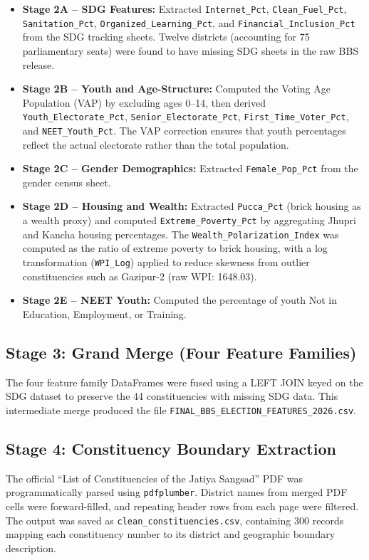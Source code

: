 \documentclass[12pt, a4paper]{article}
\begin{document}
\begin{itemize}
    \item \textbf{Stage 2A -- SDG Features:} Extracted \texttt{Internet\_Pct}, \texttt{Clean\_Fuel\_Pct}, \texttt{Sanitation\_Pct}, \texttt{Organized\_Learning\_Pct}, and \texttt{Financial\_Inclusion\_Pct} from the SDG tracking sheets. Twelve districts (accounting for 75 parliamentary seats) were found to have missing SDG sheets in the raw BBS release.
    \item \textbf{Stage 2B -- Youth and Age-Structure:} Computed the Voting Age Population (VAP) by excluding ages 0--14, then derived \texttt{Youth\_Electorate\_Pct}, \texttt{Senior\_Electorate\_Pct}, \texttt{First\_Time\_Voter\_Pct}, and \texttt{NEET\_Youth\_Pct}. The VAP correction ensures that youth percentages reflect the actual electorate rather than the total population.
    \item \textbf{Stage 2C -- Gender Demographics:} Extracted \texttt{Female\_Pop\_Pct} from the gender census sheet.
    \item \textbf{Stage 2D -- Housing and Wealth:} Extracted \texttt{Pucca\_Pct} (brick housing as a wealth proxy) and computed \texttt{Extreme\_Poverty\_Pct} by aggregating Jhupri and Kancha housing percentages. The \texttt{Wealth\_Polarization\_Index} was computed as the ratio of extreme poverty to brick housing, with a log transformation (\texttt{WPI\_Log}) applied to reduce skewness from outlier constituencies such as Gazipur-2 (raw WPI: 1648.03).
    \item \textbf{Stage 2E -- NEET Youth:} Computed the percentage of youth Not in Education, Employment, or Training.
\end{itemize}

\subsection{Stage 3: Grand Merge (Four Feature Families)}
The four feature family DataFrames were fused using a LEFT JOIN keyed on the SDG dataset to preserve the 44 constituencies with missing SDG data. This intermediate merge produced the file \texttt{FINAL\_BBS\_ELECTION\_FEATURES\_2026.csv}.

\subsection{Stage 4: Constituency Boundary Extraction}
The official ``List of Constituencies of the Jatiya Sangsad'' PDF was programmatically parsed using \texttt{pdfplumber}. District names from merged PDF cells were forward-filled, and repeating header rows from each page were filtered. The output was saved as \texttt{clean\_constituencies.csv}, containing 300 records mapping each constituency number to its district and geographic boundary description.
\end{document}
